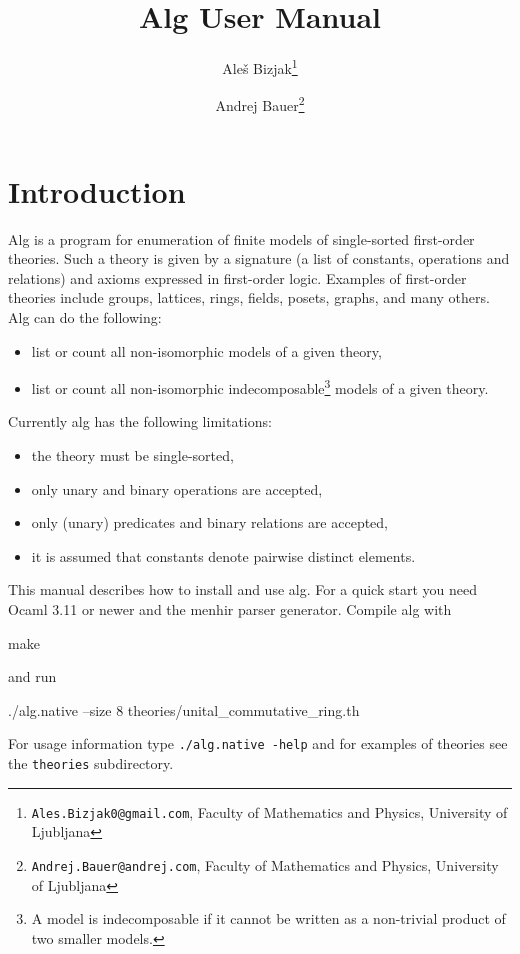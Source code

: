 \documentclass{article}
\begin{document}
\title{Alg User Manual}
\author{Ale\v{s} Bizjak\thanks{\texttt{Ales.Bizjak0@gmail.com},
  Faculty of Mathematics and Physics, University of Ljubljana}
  \and Andrej Bauer\thanks{\texttt{Andrej.Bauer@andrej.com},
    Faculty of Mathematics and Physics, University of Ljubljana}}

\maketitle

\tableofcontents

\section{Introduction}
\label{sec:introduction}

Alg is a program for enumeration of finite models of single-sorted
first-order theories. Such a theory is given by a signature (a list of
constants, operations and relations) and axioms expressed in
first-order logic. Examples of first-order theories include groups,
lattices, rings, fields, posets, graphs, and many others. Alg can do
the following:
%
\begin{itemize}
\item list or count all non-isomorphic models of a given theory,
\item list or count all non-isomorphic indecomposable\footnote{A model
  is indecomposable if it cannot be written as a non-trivial product
  of two smaller models.} models of a given theory.
\end{itemize}
%
Currently alg has the following limitations:
%
\begin{itemize}
\item the theory must be single-sorted,
\item only unary and binary operations are accepted,
\item only (unary) predicates and binary relations are accepted,
\item it is assumed that constants denote pairwise distinct elements.
\end{itemize}
%
This manual describes how to install and use alg. For a quick start
you need Ocaml 3.11 or newer and the menhir parser generator. Compile
alg with
%
\begin{shell}
make
\end{shell}
%
and run
%
\begin{shell}
./alg.native --size 8 theories/unital_commutative_ring.th
\end{shell}
%
For usage information type \texttt{./alg.native -help} and for
examples of theories see the \texttt{theories} subdirectory.
\end{document}

